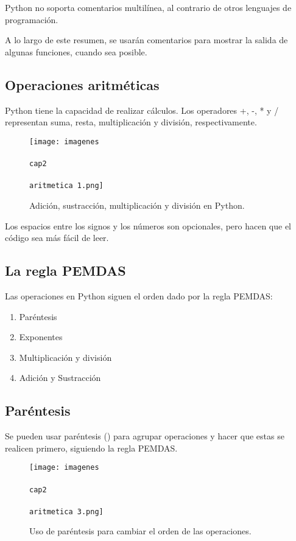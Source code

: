 \documentclass{article}
\begin{document}
Python no soporta comentarios multilínea, al contrario de otros lenguajes de programación.

A lo largo de este resumen, se usarán comentarios para mostrar la salida de algunas funciones, cuando sea posible.

\subsection{Operaciones aritméticas}

Python tiene la capacidad de realizar cálculos. Los operadores +, -, * y / representan suma, resta, multiplicación y división, respectivamente.

\begin{figure}[ht!]
  \texttt{[image: imagenes\\\\cap2\\\\aritmetica 1.png]}
  \caption{Adición, sustracción, multiplicación y división en Python.}
\end{figure}

Los espacios entre los signos y los números son opcionales, pero hacen que el código sea más fácil de leer.

\subsection{La regla PEMDAS}

Las operaciones en Python siguen el orden dado por la regla PEMDAS:

\begin{enumerate}
  \item Paréntesis
  \item Exponentes
  \item Multiplicación y división
  \item Adición y Sustracción
\end{enumerate}


\subsection{Paréntesis}

Se pueden usar paréntesis () para agrupar operaciones y hacer que estas se realicen primero, siguiendo la regla PEMDAS.

\begin{figure}[ht!]
  \texttt{[image: imagenes\\\\cap2\\\\aritmetica 3.png]}
  \caption{Uso de paréntesis para cambiar el orden de las operaciones.}
\end{figure}
\end{document}
